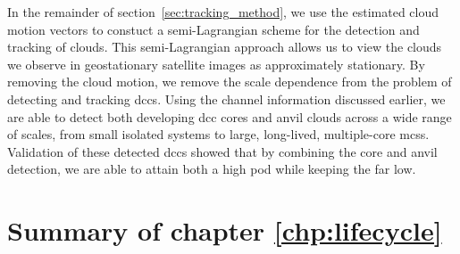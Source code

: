 In the remainder of section~\ref{sec:tracking_method}, we use the estimated cloud motion vectors to constuct a semi-Lagrangian scheme for the detection and tracking of clouds.
This semi-Lagrangian approach allows us to view the clouds we observe in geostationary satellite images as approximately stationary.
By removing the cloud motion, we remove the scale dependence from the problem of detecting and tracking \acrshort{dcc}s.
Using the channel information discussed earlier, we are able to detect both developing \acrshort{dcc} cores and anvil clouds across a wide range of scales, from small isolated systems to large, long-lived, multiple-core \acrshort{mcs}s.
Validation of these detected \acrshort{dcc}s showed that by combining the core and anvil detection, we are able to attain both a high \acrshort{pod} while keeping the \acrshort{far} low.

\section{Summary of chapter \ref{chp:lifecycle}}